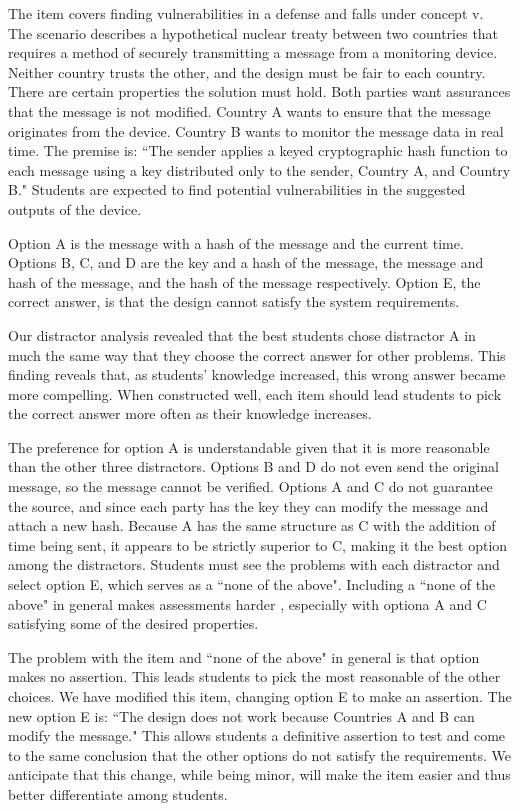 The item covers finding vulnerabilities in a defense and falls under concept \gls{v}. The scenario describes a hypothetical nuclear treaty between two countries that requires a method of securely transmitting a message from a monitoring device. Neither country trusts the other, and the design must be fair to each country. There are certain properties the solution must hold. Both parties want assurances that the message is not modified. Country A wants to ensure that the message originates from the device. Country B wants to monitor the message data in real time. The premise is: ``The sender applies a keyed cryptographic hash function to each message using a key distributed only to the sender, Country A, and Country B." Students are expected to find potential vulnerabilities in the suggested outputs of the device.

Option A is the message with a hash of the message and the current time. Options B, C, and D are the key and a hash of the message, the message and hash of the message, and the hash of the message respectively. Option E, the correct answer, is that the design cannot satisfy the system requirements. 

Our distractor analysis revealed that the best students chose distractor A in much the same way that they choose the correct answer for other problems. This finding reveals that, as students' knowledge increased, this wrong answer became more compelling. When constructed well, each item should lead students to pick the correct answer more often as their knowledge increases.

The preference for option A is understandable given that it is more reasonable than the other three distractors. Options B and D do not even send the original message, so the message cannot be verified. Options A and C do not guarantee the source, and since each party has the key they can modify the message and attach a new hash. Because A has the same structure as C with the addition of time being sent, it appears to be strictly superior to C, making it the best option among the distractors. Students must see the problems with each distractor and select option E, which serves as a ``none of the above". Including a ``none of the above" in general makes assessments harder \cite{none_of_above}, especially with optiona A and C satisfying some of the desired properties. 

The problem with the item and ``none of the above" in general is that option makes no assertion. This leads students to pick the most reasonable of the other choices. We have modified this item, changing option E to make an assertion. The new option E is: ``The design does not work because Countries A and B can modify the message." This allows students a definitive assertion to test and come to the same conclusion that the other options do not satisfy the requirements. We anticipate that this change, while being minor, will make the item easier and thus better differentiate among students.

